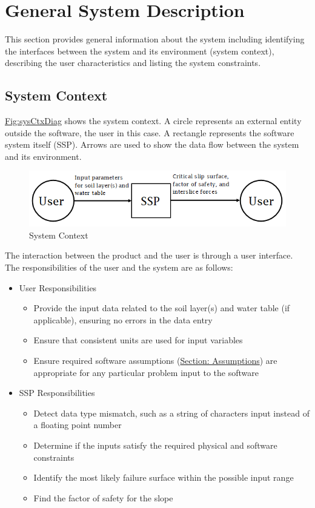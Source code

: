 \documentclass[12pt]{article}
\begin{document}
\section{General System Description}
\label{Sec:GenSysDesc}
This section provides general information about the system including identifying the interfaces between the system and its environment (system context), describing the user characteristics and listing the system constraints.
\subsection{System Context}
\label{Sec:SysContext}
\hyperref[Figure:sysCtxDiag]{Fig:sysCtxDiag} shows the system context. A circle represents an external entity outside the software, the user in this case. A rectangle represents the software system itself (SSP). Arrows are used to show the data flow between the system and its environment.
\begin{figure}
\begin{center}
\includegraphics[width=\textwidth]{../../../datafiles/SSP/SystemContextFigure.png}
\caption{System Context}
\label{Figure:sysCtxDiag}
\end{center}
\end{figure}
The interaction between the product and the user is through a user interface. The responsibilities of the user and the system are as follows:
\begin{itemize}
\item{User Responsibilities}
\begin{itemize}
\item{Provide the input data related to the soil layer(s) and water table (if applicable), ensuring no errors in the data entry}
\item{Ensure that consistent units are used for input variables}
\item{Ensure required software assumptions (\hyperref[Sec:Assumps]{Section: Assumptions}) are appropriate for any particular problem input to the software}
\end{itemize}
\item{SSP Responsibilities}
\begin{itemize}
\item{Detect data type mismatch, such as a string of characters  input instead of a floating point number}
\item{Determine if the inputs satisfy the required physical and software constraints}
\item{Identify the most likely failure surface within the possible input range}
\item{Find the factor of safety for the slope}
\end{itemize}
\end{itemize}
\end{document}
